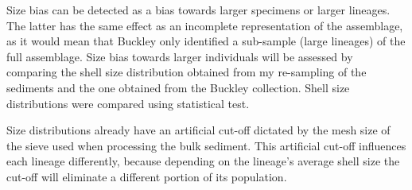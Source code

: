 \documentclass[a4paper]{article}
\begin{document}
	
	
Size bias can be detected as a bias towards larger specimens or larger lineages. The latter has the same effect as an incomplete representation of the assemblage, as it would mean that Buckley only identified a sub-sample (large lineages) of the full assemblage. Size bias towards larger individuals will be assessed by comparing the shell size distribution obtained from my re-sampling of the sediments and the one obtained from the Buckley collection. Shell size distributions were compared using statistical test. 


Size distributions already have an artificial cut-off dictated by the mesh size of the sieve used when processing the bulk sediment. This artificial cut-off influences each lineage differently, because depending on the lineage’s average shell size the cut-off will eliminate a different portion of its population. %

\end{document}
